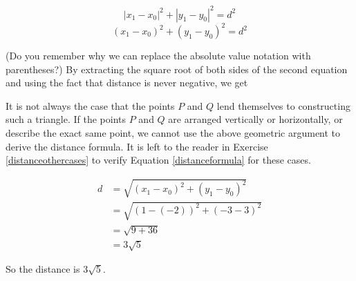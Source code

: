  \[ \left|x_{1} - x_{0}\right|^2 + \left|y_{1} - y_{0}\right|^2 = d^2\]
 \[ \left(x_{1} - x_{0}\right)^2 + \left(y_{1} - y_{0}\right)^2 = d^2\]
 
(Do you remember why we can replace the absolute value notation with parentheses?)  By extracting the square root of both sides of the second equation and using the fact that distance is never negative, we get
 
\medskip
 

\medskip

It is not always the case that the points $P$ and $Q$ lend themselves to constructing such a triangle.  If the points $P$ and $Q$ are arranged vertically or horizontally, or describe the exact same point, we cannot use the above geometric argument to derive the distance formula.  It is left to the reader in Exercise \ref{distanceothercases} to verify Equation \ref{distanceformula} for these cases.

\medskip

{
\begin{align*}
 d & =  \sqrt{\left(x_{1} - x_{0} \right)^2 + \left(y_{1} - y_{0} \right)^2} \\
   & =  \sqrt{ (1-(-2))^2 + (-3-3)^2} \\
   & =  \sqrt{9 + 36} \\
   & =  3 \sqrt{5}
\end{align*}

So the distance is $3 \sqrt{5}$. 
}

\medskip

